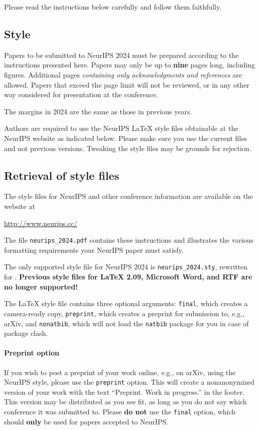 \documentclass{article}
\begin{document}
Please read the instructions below carefully and follow them faithfully.


\subsection{Style}


Papers to be submitted to NeurIPS 2024 must be prepared according to the
instructions presented here. Papers may only be up to {\bf nine} pages long,
including figures. Additional pages \emph{containing only acknowledgments and
  references} are allowed. Papers that exceed the page limit will not be
reviewed, or in any other way considered for presentation at the conference.


The margins in 2024 are the same as those in previous years.


Authors are required to use the NeurIPS \LaTeX{} style files obtainable at the
NeurIPS website as indicated below. Please make sure you use the current files
and not previous versions. Tweaking the style files may be grounds for
rejection.


\subsection{Retrieval of style files}


The style files for NeurIPS and other conference information are available on
the website at
\begin{center}
  \url{http://www.neurips.cc/}
\end{center}
The file \verb+neurips_2024.pdf+ contains these instructions and illustrates the
various formatting requirements your NeurIPS paper must satisfy.


The only supported style file for NeurIPS 2024 is \verb+neurips_2024.sty+,
rewritten for \LaTeXe{}.  \textbf{Previous style files for \LaTeX{} 2.09,
  Microsoft Word, and RTF are no longer supported!}


The \LaTeX{} style file contains three optional arguments: \verb+final+, which
creates a camera-ready copy, \verb+preprint+, which creates a preprint for
submission to, e.g., arXiv, and \verb+nonatbib+, which will not load the
\verb+natbib+ package for you in case of package clash.


\paragraph{Preprint option}
If you wish to post a preprint of your work online, e.g., on arXiv, using the
NeurIPS style, please use the \verb+preprint+ option. This will create a
nonanonymized version of your work with the text ``Preprint. Work in progress.''
in the footer. This version may be distributed as you see fit, as long as you do not say which conference it was submitted to. Please \textbf{do
  not} use the \verb+final+ option, which should \textbf{only} be used for
papers accepted to NeurIPS.
\end{document}
